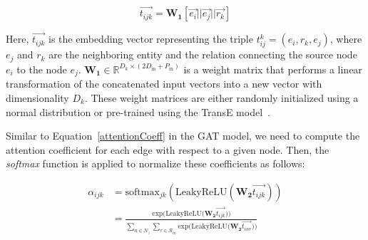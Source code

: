 \begin{equation}
	\label{attentionWithRelation}
	\overrightarrow{t_{ijk}} = \mathbf{W_1} [\overrightarrow{e_i} || \overrightarrow{e_j} || \overrightarrow{r_k}]
\end{equation}

Here, $\overrightarrow{t_{ijk}}$ is the embedding vector representing the triple $t_{ij}^k = (e_i, r_k, e_j)$, where $e_j$ and $r_k$ are the neighboring entity and the relation connecting the source node $e_i$ to the node $e_j$. $\mathbf{W_1} \in \mathbb{R}^{D_k \times (2 D_{\text{in}} + P_{\text{in}})}$ is a weight matrix that performs a linear transformation of the concatenated input vectors into a new vector with dimensionality $D_k$. These weight matrices are either randomly initialized using a normal distribution or pre-trained using the TransE model~\cite{bordes2013translating}.

Similar to Equation~\ref{attentionCoeff} in the GAT model, we need to compute the attention coefficient for each edge with respect to a given node. Then, the \textit{softmax} function is applied to normalize these coefficients as follows:

\begin{equation}
	\label{attentionRelationCoeff}
	\begin{split}
		\alpha_{ijk}& = \text{softmax}_{jk}(\text{LeakyReLU}(\mathbf{W_2} \overrightarrow{t_{ijk}}))\\
		&= \frac{
			\text{exp} \Big( \text{LeakyReLU} \Big( \mathbf{W_2} \overrightarrow{t_{ijk}}\Big) \Big)
		}
		{
			\sum_{n\in \mathcal{N}_i} \sum_{r\in \mathcal{R}_{in}}
			\text{exp} \Big( \text{LeakyReLU} \Big( \mathbf{W_2} \overrightarrow{t_{inr}} \Big) \Big)
		}
	\end{split}
\end{equation}


